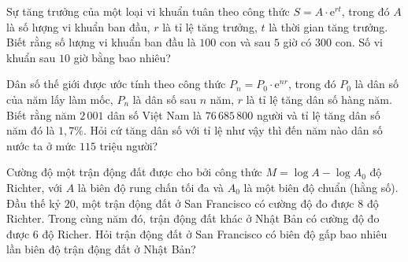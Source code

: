 \begin{ex}%
	Sự tăng trưởng của một loại vi khuẩn tuân theo công thức $S=A\cdot\mathrm{e}^{rt}$, trong đó $A$ là số lượng vi khuẩn ban đầu, $r$ là tỉ lệ tăng trưởng, $t$ là thời gian tăng trưởng. Biết rằng số lượng vi khuẩn ban đầu là $100$  con và sau $5$ giờ có $300$ con. Số vi khuẩn sau $10$ giờ bằng bao nhiêu?
\end{ex}

\begin{ex}%
	Dân số thế giới  được ước tính theo công thức $P_n=P_0\cdot\mathrm{e}^{nr}$, trong đó $P_0$ là dân số của năm lấy làm mốc, $P_n$ là dân số sau $n$ năm, $r$ là tỉ lệ tăng dân số hàng năm. Biết rằng năm $2\,001$ dân số Việt Nam là $76\,685\,800$ người và tỉ lệ tăng dân số năm đó là $1{,}7\%$. Hỏi cứ tăng dân số với tỉ lệ như vậy thì đến năm nào dân số nước ta ở mức $115$ triệu người?
\end{ex}

\begin{ex}%
	Cường độ một trận động đất được cho bởi công thức $M=\log A-\log A_0$ độ Richter, với $A$ là biên độ rung chấn tối đa và $A_0$ là một biên độ chuẩn (hằng số). Đầu thế kỷ $20$, một trận  động đất ở San Francisco có cường độ đo được $8$ độ Richter. Trong cùng năm đó, trận động đất khác ở Nhật Bản có cường độ đo được $6$ độ Richer. Hỏi trận động đất ở San Francisco có biên độ gấp bao nhiêu lần biên độ trận động đất ở Nhật Bản?
\end{ex}


